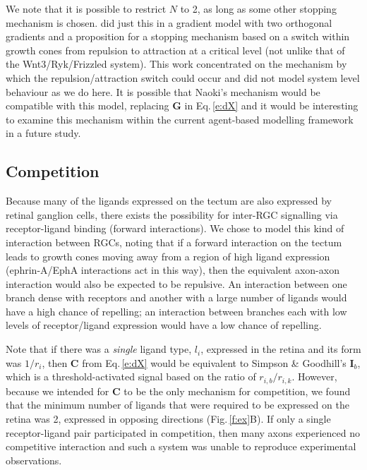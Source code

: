 \documentclass[9pt]{elife} %
\begin{document}
We note that it is possible to restrict $N$ to 2, as long as some other stopping mechanism is chosen.
\citet{naoki_revisiting_2017} did just this in a gradient model with two orthogonal gradients and a proposition for a stopping mechanism based on a switch within growth cones from repulsion to attraction at a critical level (not unlike that of the Wnt3/Ryk/Frizzled system).
This work concentrated on the mechanism by which the repulsion/attraction switch could occur and did not model system level behaviour as we do here.
It is possible that Naoki's mechanism would be compatible with this model, replacing $\mathbf{G}$ in Eq.\,\ref{e:dX} and it would be interesting to examine this mechanism within the current agent-based modelling framework in a future study.

\subsection*{Competition}

Because many of the ligands expressed on the tectum are also expressed by retinal ganglion cells, there exists the possibility for inter-RGC signalling via receptor-ligand binding (forward interactions).
We chose to model this kind of interaction between RGCs, noting that if a forward interaction on the tectum leads to growth cones moving away from a region of high ligand expression (ephrin-A/EphA interactions act in this way), then the equivalent axon-axon interaction would also be expected to be repulsive. An interaction between one branch dense with receptors and another with a large number of ligands would have a high chance of repelling; an interaction between branches each with low levels of receptor/ligand expression would have a low chance of repelling.

Note that if there was a \emph{single} ligand type, $l_i$, expressed in the retina and its form was $1/r_i$, then $\mathbf{C}$ from Eq.\,\ref{e:dX} would be equivalent to Simpson \& Goodhill's $\mathbf{I}_b$, which is a threshold-activated signal based on the ratio of $r_{i,b}/r_{i,k}$.
However, because we intended for $\mathbf{C}$ to be the only mechanism for competition, we found that the minimum number of ligands that were required to be expressed on the retina was 2, expressed in opposing directions (Fig.\,\ref{f:ex}B). If only a single receptor-ligand pair participated in competition, then many axons experienced no competitive interaction and such a system was unable to reproduce experimental observations.
\end{document}
